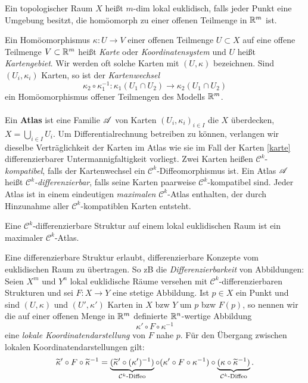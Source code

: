 \begin{definition}
\begin{mdframed}
Ein topologischer Raum $X$ heißt $m$-dim lokal euklidisch, falls jeder Punkt eine Umgebung besitzt, die homöomorph zu einer offenen Teilmenge in $\R^m$ ist.
\end{mdframed}
\end{definition}
Ein Homöomorphismus $\kappa:U\to V$ einer offenen Teilmenge $U\subset X$ auf eine offene Teilmenge $V\subset \R^m$ heißt \emph{Karte} oder \emph{Koordinatensystem} und $U$ heißt \emph{Kartengebiet}. Wir werden oft solche Karten mit $(U,\kappa)$ bezeichnen. Sind $(U_i,\kappa_i)$ Karten, so ist der \emph{Kartenwechsel}
$$\kappa_2\circ \kappa_1^{-1}:\kappa_1(U_1\cap U_2) \longrightarrow \kappa_2(U_1\cap U_2)$$
ein Homöomorphismus offener Teilmengen des Modells $\R^m$. \\\\
Ein \textbf{Atlas} ist eine Familie $\AA$ von Karten $(U_i,\kappa_i)_{i\in I}$ die $X$ überdecken, $X= \bigcup\limits_{i \in I}U_i$. Um Differentialrechnung betreiben zu können, verlangen wir dieselbe Verträglichkeit der Karten im Atlas wie sie im Fall der Karten \eqref{karte} differenzierbarer Untermannigfaltigkeit vorliegt. Zwei Karten heißen $\mathcal{C}^k$-\emph{kompatibel}, falls der Kartenwechsel ein $\mathcal{C}^k$-Diffeomorphismus ist. Ein Atlas $\AA$ heißt \emph{$\mathcal{C}^k$-differenzierbar}, falls seine Karten paarweise $\mathcal{C}^k$-kompatibel sind. Jeder Atlas ist in einem eindeutigen \emph{maximalen} $\mathcal{C}^k$-Atlas enthalten, der durch Hinzunahme aller $\mathcal{C}^k$-kompatiblen Karten entsteht.

\begin{definition}
\begin{mdframed}
Eine $\mathcal{C}^k$-differenzierbare Struktur auf einem lokal euklidischen Raum ist ein maximaler $\mathcal{C}^k$-Atlas.
\end{mdframed}
\end{definition}
Eine differenzierbare Struktur erlaubt, differenzierbare Konzepte vom euklidischen Raum zu übertragen. So zB die \emph{Differenzierbarkeit} von Abbildungen: Seien $X^m$ und $Y^n$ lokal euklidische Räume versehen mit $\mathcal{C}^k$-differenzierbaren Strukturen und sei $F:X\to Y$ eine stetige Abbildung. Ist $p \in X$ ein Punkt und sind $(U,\kappa)$ und $(U',\kappa')$ Karten in $X$ bzw $Y$ um $p$ bzw $F(p)$, so nennen wir die auf einer offenen Menge in $\R^m$ definierte $\R^n$-wertige Abbildung
$$\kappa' \circ F \circ \kappa^{-1}$$
eine \emph{lokale Koordinatendarstellung} von $F$ nahe $p$. Für den Übergang zwischen lokalen Koordinatendarstellungen gilt:
$$\widetilde{\kappa}' \circ F \circ \widetilde{\kappa}^{-1} = \underbrace{(\widetilde{\kappa}' \circ (\kappa')^{-1})}_{\mathcal{C}^k\te{-Diffeo}} \circ (\kappa' \circ F \circ \kappa^{-1}) \circ \underbrace{(\kappa \circ \widetilde{\kappa}^{-1})}_{\mathcal{C}^k\te{-Diffeo}}.$$


